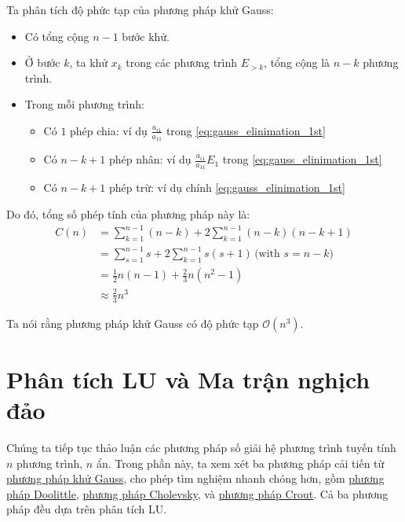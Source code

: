 \documentclass[../../Lectures]{subfiles}
\begin{document}
Ta phân tích độ phức tạp của phương pháp khử Gauss:
\begin{itemize}
    \item Có tổng cộng \(n - 1\) bước khử.

    \item Ở bước \(k\), ta khử \(x_k\) trong các phương trình \(E_{> k}\), tổng
        cộng là \(n - k\) phương trình.

    \item Trong mỗi phương trình:
        \begin{itemize}
            \item Có \(1\) phép chia: ví dụ \(\frac{a_{i1}}{a_11}\) trong
                \eqref{eq:gauss_elinimation_1st}

            \item Có \(n - k + 1\) phép nhân: ví dụ \(\frac{a_{i1}}{a_11} E_1\)
                trong \eqref{eq:gauss_elinimation_1st}

            \item Có \(n - k + 1\) phép trừ: ví dụ chính
                \eqref{eq:gauss_elinimation_1st}
        \end{itemize}
\end{itemize}

Do đó, tổng số phép tính của phương pháp này là:
\begin{align*}
    C(n) &= \sum_{k = 1}^{n - 1} (n - k) + 2 \sum_{k = 1}^{n - 1} (n - k)(n - k + 1) \\
         &= \sum_{s = 1}^{n - 1} s + 2 \sum_{k = 1}^{n - 1} s(s + 1) \, \text{(with \(s = n - k\))} \\
         &= \frac{1}{2} n(n - 1) + \frac{2}{3} n(n^2 - 1) \\
         &\approx \frac{2}{3} n^3
\end{align*}

Ta nói rằng phương pháp khử Gauss có độ phức tạp \(\mathcal{O} (n^3)\).



\section{Phân tích LU và Ma trận nghịch đảo}

Chúng ta tiếp tục thảo luận các phương pháp số giải hệ phương trình tuyến tính
\(n\) phương trình, \(n\) ẩn. Trong phần này, ta xem xét ba phương pháp cải tiến
từ \hyperref[method:gauss_elimination]{phương pháp khử Gauss}, cho phép tìm
nghiệm nhanh chóng hơn, gồm \hyperref[thm:lu_doolittle]{phương pháp Doolittle},
\hyperref[method:cholevsky]{phương pháp Cholevsky}, và
\hyperref[method:crout]{phương pháp Crout}. Cả ba phương pháp đều dựa trên phân
tích LU.
\end{document}
